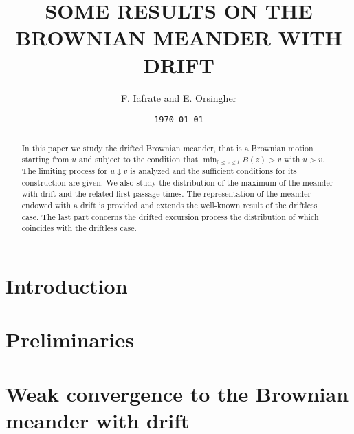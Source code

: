 \documentclass[10pt, a4paper, reqno]{amsart}
\title{SOME RESULTS ON THE BROWNIAN MEANDER WITH DRIFT}
\author{F. Iafrate and E. Orsingher}
\date{\scriptsize \texttt{\today}}
\numberwithin{equation}{section}
\theoremstyle{remark}
\theoremstyle{plain}
\theoremstyle{definition}
\theoremstyle{definition}
\begin{document}
\begin{abstract}
In this paper we study the drifted Brownian meander, that is a Brownian motion starting from $ u $
and subject to the condition that $ \min_{ 0\leq z \leq t} B(z)> v  $ with $  u > v $. 
The limiting process for $ u \downarrow v $ is analyzed and the sufficient conditions for its construction
are given. 
We also study the distribution of the maximum of the meander with drift and the related first-passage times. 
The representation of the meander endowed with a drift is provided and extends the well-known result of the 
driftless case. 
The last part concerns the drifted excursion process the distribution of which coincides with the driftless case. 
\end{abstract}
\maketitle


\section{Introduction}





\section{Preliminaries}\label{sec:prelim}




\section{Weak convergence to the Brownian meander with drift}\label{sec:joint}

%
\end{document}

